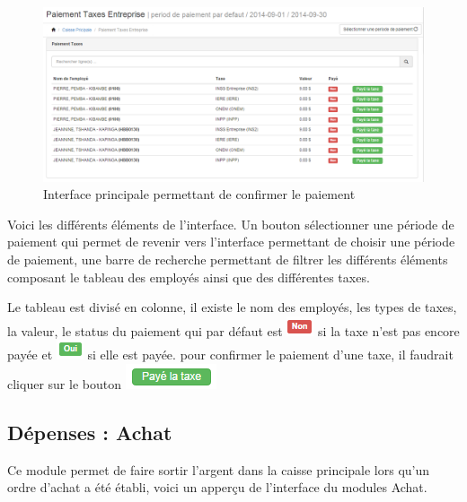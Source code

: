 \documentclass[12pt,a4paper]{report}
\begin{document}
\begin{figure}[h]
\begin{center}
\includegraphics[width=14cm]{pic/PaieTaxesEntre2.png}
\end{center}
\caption{Interface principale permettant de confirmer le paiement}
\label{Interface principale permettant de confirmer le paiement}
\end{figure}


Voici les différents éléments de l'interface. Un bouton sélectionner une période de paiement qui permet de revenir vers l'interface permettant de choisir une période de paiement, une barre de recherche permettant de filtrer les différents éléments composant le tableau des employés ainsi que des différentes taxes.

Le tableau est divisé en colonne, il existe le nom des employés, les types de taxes, la valeur, le status du paiement qui par défaut est \includegraphics[scale=0.7]{pic/NonTaxes.png} si la taxe n'est pas encore payée et \includegraphics[scale=0.7]{pic/OuiTaxes.png} si elle est payée. pour confirmer le paiement d'une taxe, il faudrait cliquer sur le bouton \includegraphics[scale=0.7]{pic/PayeTaxe.png}

\subsection{Dépenses : Achat}
Ce module permet de faire sortir l'argent dans la caisse principale lors qu'un ordre d'achat a été établi, voici un apperçu de l'interface du modules Achat.
\end{document}
